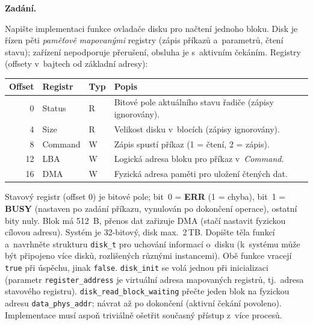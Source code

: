 \begin{priklad}
\par
\textbf{Zadání.}\par
Napište implementaci funkce ovladače disku pro načtení jednoho bloku. Disk je řízen pěti \emph{paměťově mapovanými} registry (zápis příkazů a~parametrů, čtení stavu); zařízení nepodporuje přerušení, obsluha je s~aktivním čekáním. Registry (offsety v~bajtech od základní adresy):

\begin{center}\small
\begin{tabular}{rlll}
\toprule
Offset & Registr & Typ & Popis \\
\midrule
0  & Status  & R & Bitové pole aktuálního stavu řadiče (zápisy ignorovány). \\
4  & Size    & R & Velikost disku v~blocích (zápisy ignorovány). \\
8  & Command & W & Zápis spustí příkaz (1 = čtení, 2 = zápis). \\
12 & LBA     & W & Logická adresa bloku pro příkaz v~\textit{Command}. \\
16 & DMA     & W & Fyzická adresa paměti pro uložení čtených dat. \\
\bottomrule
\end{tabular}
\end{center}

\noindent Stavový registr (offset 0) je bitové pole; bit~0 = \textbf{ERR} (1 = chyba), bit~1 = \textbf{BUSY} (nastaven po zadání příkazu, vynulován po dokončení operace), ostatní bity nuly. Blok má 512~B, přenos dat zařizuje DMA (stačí nastavit fyzickou cílovou adresu). Systém je 32-bitový, disk max.\ 2\,TB. Dopište těla funkcí a~navrhněte strukturu \texttt{disk\_t} pro uchování informací o~disku (k~systému může být připojeno více disků, rozlišených různými instancemi). Obě funkce vracejí \texttt{true} při úspěchu, jinak \texttt{false}. \texttt{disk\_init} se volá jednou při inicializaci (parametr \texttt{register\_address} je virtuální adresa mapovaných registrů, tj.\ adresa stavového registru). \texttt{disk\_read\_block\_waiting} přečte jeden blok na fyzickou adresu \texttt{data\_phys\_addr}; návrat až po dokončení (aktivní čekání povoleno). Implementace musí aspoň triviálně ošetřit současný přístup z~více procesů.


\end{priklad}

